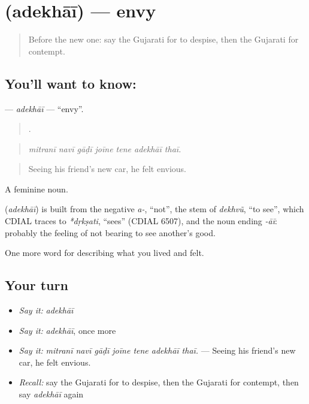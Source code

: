 \section[\texorpdfstring{\gu{અદેખાઈ} (adekhāī)}{અદેખાઈ (adekhāī)}]{ (adekhāī) — envy}

\label{lesson:GU-C457-adekhai}



\begin{quote}
Before the new one: say the Gujarati for to despise, then the Gujarati for contempt.
\end{quote}

\subsection*{You'll want to know: }
\textbf{} — \emph{adekhāī} — \textquotedblleft{}envy\textquotedblright{}.

\begin{quote}
      .
\end{quote}

\begin{quote}
\emph{mitranī navī gāḍī joīne tene adekhāī thaī.}
\end{quote}

\begin{quote}
Seeing his friend's new car, he felt envious.
\end{quote}

A feminine noun.

\begin{cousinweb}
\textbf{} (\emph{adekhāī}) is built from the negative \emph{a-}, \textquotedblleft{}not\textquotedblright{}, the stem of \emph{dekhvũ}, \textquotedblleft{}to see\textquotedblright{}, which CDIAL traces to \emph{*dṛkṣati}, \textquotedblleft{}sees\textquotedblright{} (CDIAL 6507), and the noun ending \emph{-āī}: probably the feeling of not bearing to see another's good.
\end{cousinweb}

\begin{grammarlens}[title={What you've built}]
One more word for describing what you lived and felt.
\end{grammarlens}

\subsection*{Your turn}
\begin{itemize}
\raggedright
  \item \emph{Say it:} \emph{adekhāī}
  \item \emph{Say it:} \emph{adekhāī}, once more
  \item \emph{Say it:} \emph{mitranī navī gāḍī joīne tene adekhāī thaī.} — Seeing his friend's new car, he felt envious.
  \item \emph{Recall:} say the Gujarati for to despise, then the Gujarati for contempt, then say \emph{adekhāī} again
\end{itemize}


